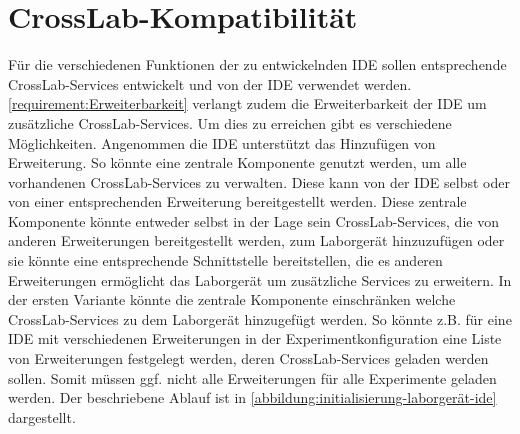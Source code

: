 \section{CrossLab-Kompatibilität}\label{section:konzeption:crosslab-kompatibilität}


Für die verschiedenen Funktionen der zu entwickelnden IDE sollen entsprechende CrossLab-Services entwickelt und von der IDE verwendet werden. \autoref{requirement:Erweiterbarkeit} verlangt zudem die Erweiterbarkeit der IDE um zusätzliche CrossLab-Services. Um dies zu erreichen gibt es verschiedene Möglichkeiten. Angenommen die IDE unterstützt das Hinzufügen von Erweiterung. So könnte eine zentrale Komponente genutzt werden, um alle vorhandenen CrossLab-Services zu verwalten. Diese kann von der IDE selbst oder von einer entsprechenden Erweiterung bereitgestellt werden. Diese zentrale Komponente könnte entweder selbst in der Lage sein CrossLab-Services, die von anderen Erweiterungen bereitgestellt werden, zum Laborgerät hinzuzufügen oder sie könnte eine entsprechende Schnittstelle bereitstellen, die es anderen Erweiterungen ermöglicht das Laborgerät um zusätzliche Services zu erweitern. In der ersten Variante könnte die zentrale Komponente einschränken welche CrossLab-Services zu dem Laborgerät hinzugefügt werden. So könnte z.B. für eine IDE mit verschiedenen Erweiterungen in der Experimentkonfiguration eine Liste von Erweiterungen festgelegt werden, deren CrossLab-Services geladen werden sollen. Somit müssen ggf. nicht alle Erweiterungen für alle Experimente geladen werden. Der beschriebene Ablauf ist in \autoref{abbildung:initialisierung-laborgerät-ide} dargestellt.

